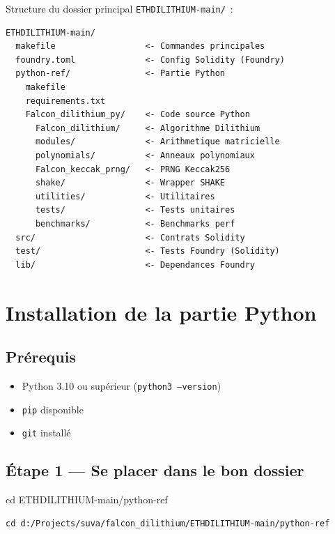 \documentclass[12pt, a4paper]{article}
\begin{document}
\bigskip
Structure du dossier principal \texttt{ETHDILITHIUM-main/}~:
\begin{lstlisting}[style=bash]
ETHDILITHIUM-main/
  makefile                  <- Commandes principales
  foundry.toml              <- Config Solidity (Foundry)
  python-ref/               <- Partie Python
    makefile
    requirements.txt
    Falcon_dilithium_py/    <- Code source Python
      Falcon_dilithium/     <- Algorithme Dilithium
      modules/              <- Arithmetique matricielle
      polynomials/          <- Anneaux polynomiaux
      Falcon_keccak_prng/   <- PRNG Keccak256
      shake/                <- Wrapper SHAKE
      utilities/            <- Utilitaires
      tests/                <- Tests unitaires
      benchmarks/           <- Benchmarks perf
  src/                      <- Contrats Solidity
  test/                     <- Tests Foundry (Solidity)
  lib/                      <- Dependances Foundry
\end{lstlisting}

\section{Installation de la partie Python}

\subsection{Prérequis}

\begin{itemize}
  \item Python 3.10 ou supérieur (\texttt{python3 --version})
  \item \texttt{pip} disponible
  \item \texttt{git} installé
\end{itemize}

\subsection{Étape 1 — Se placer dans le bon dossier}

\begin{cmdbox}{cd ETHDILITHIUM-main/python-ref}
\begin{lstlisting}[style=bash]
cd d:/Projects/suva/falcon_dilithium/ETHDILITHIUM-main/python-ref
\end{lstlisting}
\end{cmdbox}
\end{document}
